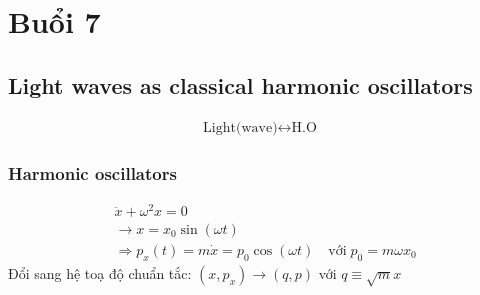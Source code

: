 \documentclass{report}
\begin{document}
\chapter{Buổi 7}
\section{Light waves as classical harmonic oscillators}
\begin{gather}
	\text{Light(wave)} \leftrightarrow \text{H.O}
\end{gather}
\subsection{Harmonic oscillators}
\begin{equation}
	\begin{aligned}
		&\ddot{x} + \omega^{2} x = 0 \\
		&\rightarrow x = x_{0} \sin(\omega t)\\
		&\Rightarrow p_{x}(t) = m \dot{x} = p_{0} \cos(\omega t) \quad \text{với}\; p_{0} = m \omega x_{0}
	\end{aligned}
\end{equation}
Đổi sang hệ toạ độ chuẩn tắc: $(x,p_{x}) \rightarrow (q,p)$ với $q \equiv \sqrt{m}x$
\end{document}
